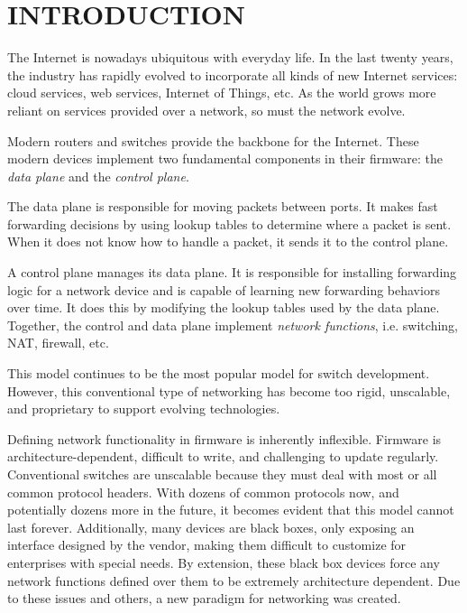 \chapter{INTRODUCTION} \label{ch:intro}

%
%



The Internet is nowadays ubiquitous with everyday life. In the last twenty years,
the industry has rapidly evolved to incorporate all kinds of new Internet services:
cloud services, web services, Internet of Things, etc. As the world grows
more reliant on services provided over a network, so must the network evolve.

Modern routers and switches provide the backbone for the Internet.
These modern devices implement two fundamental components in their firmware: the
\emph{data plane} and the \emph{control plane}.

The data plane is responsible for moving packets between ports.
It makes fast forwarding decisions by using lookup tables to determine
where a packet is sent. When it does
not know how to handle a packet, it sends it to the control plane.

A control plane manages its data plane.
It is responsible for installing forwarding logic for a network device and is
capable of learning new forwarding behaviors over time.
It does this by modifying the lookup tables used by the data plane.
Together, the control and data plane implement \emph{network functions}, i.e. switching, NAT, firewall, etc.

This model continues to be the most popular model for switch development.
However,
this conventional type of networking has become too rigid, unscalable, and
proprietary to support evolving technologies. 

Defining network functionality in firmware is inherently inflexible.
Firmware is architecture-dependent, difficult to write, and challenging to update
regularly.
Conventional switches are unscalable because they must deal with most or all
common protocol headers.
With dozens of common protocols now, and potentially dozens more in the future,
it becomes evident that this model cannot last forever.
Additionally, many devices are black boxes,
only exposing an interface designed by the vendor,
making them difficult to customize for enterprises with special needs.
By extension, these black box devices force any network functions
defined over them to be extremely architecture dependent.
Due to these issues and others, a new paradigm for networking was created. 


